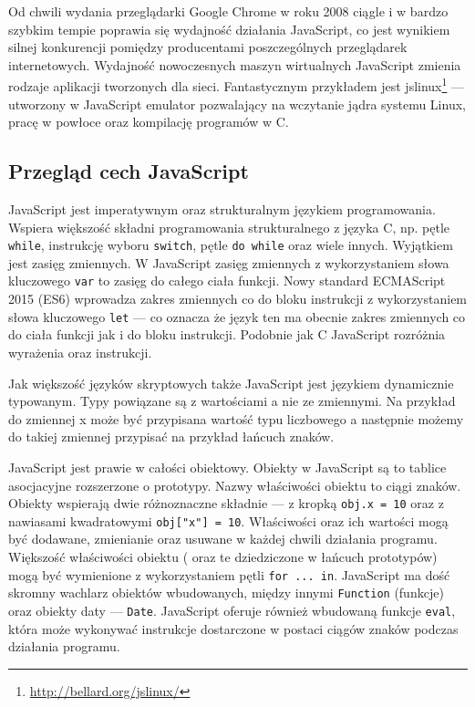 Od chwili wydania przeglądarki Google Chrome w roku 2008 ciągle i w bardzo szybkim tempie poprawia się wydajność działania JavaScript, co jest wynikiem silnej konkurencji pomiędzy producentami poszczególnych przeglądarek internetowych. Wydajność nowoczesnych maszyn wirtualnych JavaScript zmienia rodzaje aplikacji tworzonych dla sieci. Fantastycznym przykładem jest jslinux\footnote{\url{http://bellard.org/jslinux/}} --- utworzony w JavaScript emulator pozwalający na wczytanie jądra systemu Linux, pracę w powłoce oraz kompilację programów w C.

\subsection{Przegląd cech JavaScript}

JavaScript jest imperatywnym oraz strukturalnym językiem programowania. Wspiera większość składni programowania strukturalnego z języka C, np. pętle \verb|while|, instrukcję wyboru \verb|switch|, pętle \verb|do while| oraz wiele innych. Wyjątkiem jest zasięg zmiennych. W JavaScript zasięg zmiennych z wykorzystaniem słowa kluczowego \verb|var| to zasięg do całego ciała funkcji. Nowy standard ECMAScript 2015 (ES6) wprowadza zakres zmiennych co do bloku instrukcji z wykorzystaniem słowa kluczowego \verb|let| --- co oznacza że język ten ma obecnie zakres zmiennych co do ciała funkcji jak i do bloku instrukcji. Podobnie jak C JavaScript rozróżnia wyrażenia oraz instrukcji\cite{jsWiki}. 

Jak większość języków skryptowych także JavaScript jest językiem dynamicznie typowanym. Typy powiązane są z wartościami a nie ze zmiennymi. Na przykład do zmiennej x może być przypisana wartość typu liczbowego a następnie możemy do takiej zmiennej przypisać na przykład łańcuch znaków\cite{jsWiki}. 

JavaScript jest prawie w całości obiektowy. Obiekty w JavaScript są to tablice asocjacyjne rozszerzone o prototypy. Nazwy właściwości obiektu to ciągi znaków. Obiekty wspierają dwie różnoznaczne składnie --- z kropką \verb|obj.x = 10| oraz z nawiasami kwadratowymi \verb|obj["x"] = 10|. Właściwości oraz ich wartości mogą być dodawane, zmienianie oraz usuwane w każdej chwili działania programu. Większość właściwości obiektu ( oraz te dziedziczone w łańcuch prototypów) mogą być wymienione z wykorzystaniem pętli \verb|for ... in|. JavaScript ma dość skromny wachlarz obiektów wbudowanych, między innymi \verb|Function| (funkcje) oraz obiekty daty --- \verb|Date|. JavaScript oferuje również wbudowaną funkcje \verb|eval|, która może wykonywać instrukcje dostarczone w postaci ciągów znaków podczas działania programu\cite{jsWiki}. 

